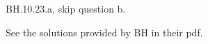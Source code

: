 

\setcounter{theorem}{22}
\begin{exercise}
BH.10.23.a, skip question b.
\begin{solution}
See the solutions provided by BH in their pdf.
\end{solution}
\end{exercise}



